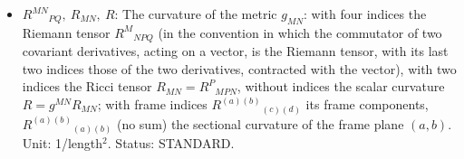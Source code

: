 \documentclass[
  10pt,
]{article}
\begin{document}
\begin{itemize}
  \(Q\): A coordinate index of eight dimensions (also
  \(Q_1, Q_2, \dots\)), running over \(x_0, \dots, x_7\); a repeated
  index is summed. Status: STANDARD.
\item
  \(R^{MN}{}_{PQ},\ R_{MN},\ R\): The curvature of the metric
  \(g_{MN}\): with four indices the Riemann tensor \(R^M{}_{NPQ}\) (in
  the convention in which the commutator of two covariant derivatives,
  acting on a vector, is the Riemann tensor, with its last two indices
  those of the two derivatives, contracted with the vector), with two
  indices the Ricci tensor \(R_{MN} = R^P{}_{MPN}\), without indices the
  scalar curvature \(R = g^{MN}R_{MN}\); with frame indices
  \(R^{(a)(b)}{}_{(c)(d)}\) its frame components,
  \(R^{(a)(b)}{}_{(a)(b)}\) (no sum) the sectional curvature of the
  frame plane \((a, b)\). Unit: 1/length\(^2\). Status: STANDARD.
\end{itemize}
\end{document}
